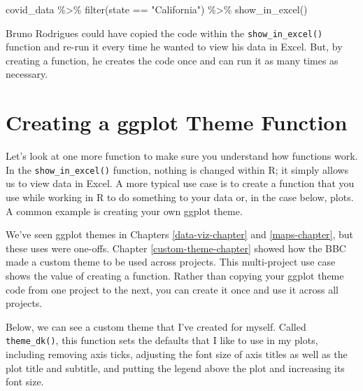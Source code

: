 \documentclass[
]{book}
\newenvironment{Shaded}{\begin{snugshade}}{\end{snugshade}}
\newcommand{\FunctionTok}[1]{\textcolor[rgb]{0.00,0.00,0.00}{#1}}
\newcommand{\NormalTok}[1]{#1}
\newcommand{\SpecialCharTok}[1]{\textcolor[rgb]{0.00,0.00,0.00}{#1}}
\newcommand{\StringTok}[1]{\textcolor[rgb]{0.31,0.60,0.02}{#1}}
\begin{document}
\begin{Shaded}
\begin{Highlighting}[]
\NormalTok{covid\_data }\SpecialCharTok{\%\textgreater{}\%} 
  \FunctionTok{filter}\NormalTok{(state }\SpecialCharTok{==} \StringTok{"California"}\NormalTok{) }\SpecialCharTok{\%\textgreater{}\%} 
  \FunctionTok{show\_in\_excel}\NormalTok{()}
\end{Highlighting}
\end{Shaded}

Bruno Rodrigues could have copied the code within the \texttt{show\_in\_excel()} function and re-run it every time he wanted to view his data in Excel. But, by creating a function, he creates the code once and can run it as many times as necessary.

\hypertarget{creating-a-ggplot-theme-function}{%
\section*{Creating a ggplot Theme Function}\label{creating-a-ggplot-theme-function}}

Let's look at one more function to make sure you understand how functions work. In the \texttt{show\_in\_excel()} function, nothing is changed within R; it simply allows us to view data in Excel. A more typical use case is to create a function that you use while working in R to do something to your data or, in the case below, plots. A common example is creating your own ggplot theme.

We've seen ggplot themes in Chapters \ref{data-viz-chapter} and \ref{maps-chapter}, but these uses were one-offs. Chapter \ref{custom-theme-chapter} showed how the BBC made a custom theme to be used across projects. This multi-project use case shows the value of creating a function. Rather than copying your ggplot theme code from one project to the next, you can create it once and use it across all projects.

Below, we can see a custom theme that I've created for myself. Called \texttt{theme\_dk()}, this function sets the defaults that I like to use in my plots, including removing axis ticks, adjusting the font size of axis titles as well as the plot title and subtitle, and putting the legend above the plot and increasing its font size.
\end{document}
